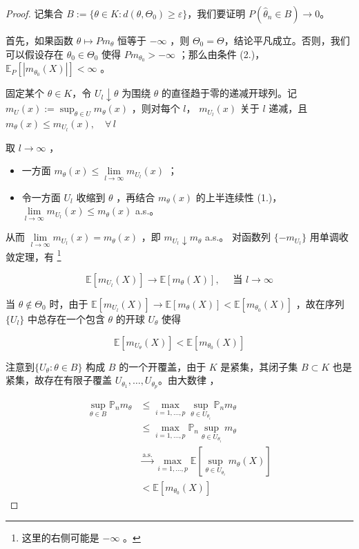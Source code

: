 \begin{proof}

记集合 $B := \{\theta \in K : d(\theta, \Theta_0) \geq \varepsilon\}$，我们要证明 $P(\widehat{\theta}_n \in B) \to 0$。

首先，如果函数 $\theta \mapsto Pm_\theta$ 恒等于 $-\infty$ ，则 $\Theta_0 = \Theta$，结论平凡成立。否则，我们可以假设存在 $\theta_0\in\Theta_0$ 使得 $Pm_{\theta_0} > -\infty$ ；那么由条件 (2.)， $\mathbb{E}_P[|m_{\theta_0}(X)|]<\infty$ 。

固定某个 $\theta \in K$，令 $U_l \downarrow \theta$ 为围绕 $\theta$ 的直径趋于零的递减开球列。记 $m_U(x) := \sup_{\theta\in U} m_\theta(x)$ ，则对每个 $l$， $m_{U_l}(x)$ 关于 $l$ 递减，且 $m_\theta(x) \leq m_{U_l}(x),\quad \forall\, l$

取 $l\to\infty$ ，

\begin{itemize}
\tightlist
\item
  一方面 $m_\theta(x)\le \lim\limits_{l\to\infty}m_{U_l}(x)$ ；
\item
  令一方面 $U_l$ 收缩到 $\theta$ ，再结合 $m_\theta(x)$ 的上半连续性 (1.)， $\lim\limits_{l\to\infty} m_{U_l}(x) \leq m_\theta(x)$ a.s.。
\end{itemize}

从而 $\lim\limits_{l\to\infty} m_{U_l}(x) = m_\theta(x)$ ，即 $m_{U_l} \downarrow m_\theta$ a.s.。
对函数列 $\{-m_{U_l}\}$ 用单调收敛定理，有 \footnote{这里的右侧可能是 $-\infty$ 。}

$$\mathbb{E}[m_{U_l}(X)] \to \mathbb{E}[m_\theta(X)] ,\quad \text{ 当 }l\to\infty$$


当 $\theta\not\in\Theta_0$ 时，由于 $\mathbb{E}[m_{U_l}(X)] \to \mathbb E[m_\theta(X)]<\mathbb E[m_{\theta_0}(X)]$ ，故在序列 $\{U_l\}$ 中总存在一个包含 $\theta$ 的开球 $U_\theta$ 使得

\begin{equation}
\label{eq:ch9:tag-4}
\mathbb E[m_{U_\theta}(X)]<\mathbb E[m_{\theta_0}(X)]
\end{equation}

注意到$\{U_\theta : \theta \in B\}$ 构成 $B$ 的一个开覆盖，由于 $K$ 是紧集，其闭子集 $B \subset K$ 也是紧集，故存在有限子覆盖 $U_{\theta_1}, \dots, U_{\theta_p}$。由大数律 ，

\begin{equation}
\label{eq:ch9:tag-5}
\begin{aligned} \sup_{\theta\in B}\mathbb P_nm_\theta&\le\max_{i=1,\dots,p}\sup_{\theta\in U_{\theta_i}} \mathbb P_nm_\theta\\ &\le \max_{i=1,\dots,p}\mathbb P_n\sup_{\theta\in U_{\theta_i}}m_\theta\\ &\xrightarrow{\text{a.s.}}\max_{i=1,\dots,p}\mathbb{E}\left[\sup_{\theta\in U_{\theta_i}}m_\theta(X)\right]\\ &<\mathbb{E}[m_{\theta_0}(X)] \end{aligned}
\end{equation}


\end{proof}
